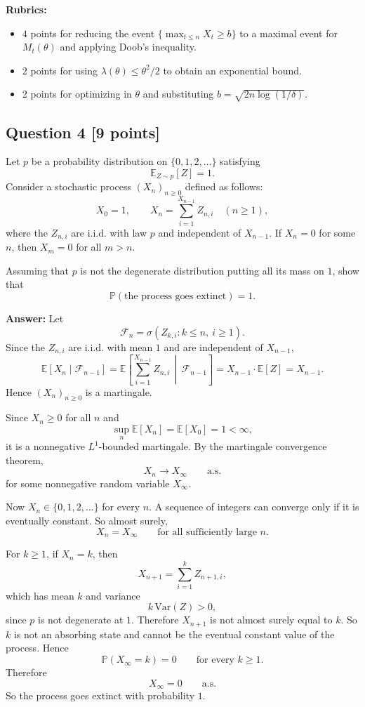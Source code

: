 \documentclass[11pt]{article}
\theoremstyle{definition}
\begin{document}
\textbf{Rubrics:}
\begin{itemize}[leftmargin=2em]
    \item \(4\) points for reducing the event \(\{\max_{t\le n}X_t\ge b\}\) to a maximal event for \(M_t(\theta)\) and applying Doob's inequality.
    \item \(2\) points for using \(\lambda(\theta)\le \theta^2/2\) to obtain an exponential bound.
    \item \(2\) points for optimizing in \(\theta\) and substituting \(b=\sqrt{2n\log(1/\delta)}\).
\end{itemize}

\subsection*{Question 4 \hfill [9 points]}

Let \(p\) be a probability distribution on \(\{0,1,2,\dots\}\) satisfying
\[
\mathbb E_{Z\sim p}[Z]=1.
\]
Consider a stochastic process \((X_n)_{n\ge 0}\) defined as follows:
\[
X_0=1,
\qquad
X_n=\sum_{i=1}^{X_{n-1}} Z_{n,i}
\quad (n\ge 1),
\]
where the \(Z_{n,i}\) are i.i.d. with law \(p\) and independent of \(X_{n-1}\). If \(X_n=0\) for some \(n\), then \(X_m=0\) for all \(m>n\).

Assuming that \(p\) is not the degenerate distribution putting all its mass on \(1\), show that
\[
\mathbb P(\text{the process goes extinct})=1.
\]

\textbf{Answer:}
Let
\[
\mathcal F_n=\sigma(Z_{k,i}:k\le n,\ i\ge 1).
\]
Since the \(Z_{n,i}\) are i.i.d. with mean \(1\) and are independent of \(X_{n-1}\),
\[
\mathbb E[X_n\mid \mathcal F_{n-1}]
=
\mathbb E\left[\sum_{i=1}^{X_{n-1}} Z_{n,i}\,\middle|\, \mathcal F_{n-1}\right]
=
X_{n-1}\cdot \mathbb E[Z]
=
X_{n-1}.
\]
Hence \((X_n)_{n\ge 0}\) is a martingale.

Since \(X_n\ge 0\) for all \(n\) and
\[
\sup_n \mathbb E[X_n]=\mathbb E[X_0]=1<\infty,
\]
it is a nonnegative \(L^1\)-bounded martingale. By the martingale convergence theorem,
\[
X_n\to X_\infty
\qquad \text{a.s.}
\]
for some nonnegative random variable \(X_\infty\).

Now \(X_n\in \{0,1,2,\dots\}\) for every \(n\). A sequence of integers can converge only if it is eventually constant. So almost surely,
\[
X_n=X_\infty
\qquad \text{for all sufficiently large } n.
\]

For \(k\ge 1\), if \(X_n=k\), then
\[
X_{n+1}=\sum_{i=1}^k Z_{n+1,i},
\]
which has mean \(k\) and variance
\[
k\,\mathrm{Var}(Z)>0,
\]
since \(p\) is not degenerate at \(1\). Therefore \(X_{n+1}\) is not almost surely equal to \(k\). So \(k\) is not an absorbing state and cannot be the eventual constant value of the process. Hence
\[
\mathbb P(X_\infty=k)=0
\qquad \text{for every } k\ge 1.
\]
Therefore
\[
X_\infty=0
\qquad \text{a.s.}
\]
So the process goes extinct with probability \(1\).
\end{document}
